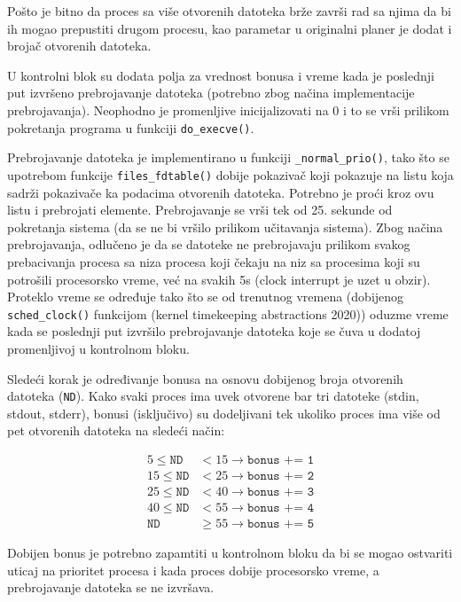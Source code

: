 Pošto je bitno da proces sa više otvorenih datoteka brže završi rad sa njima da bi ih mogao prepustiti drugom procesu, kao parametar u originalni planer je dodat i brojač otvorenih datoteka.

U kontrolni blok su dodata polja za vrednost bonusa i vreme kada je poslednji put izvršeno prebrojavanje datoteka (potrebno zbog načina implementacije prebrojavanja). Neophodno je promenljive inicijalizovati na 0 i to se vrši prilikom pokretanja programa u funkciji \verb|do_execve()|. 

Prebrojavanje datoteka je implementirano u funkciji \verb|_normal_prio()|, tako što se upotrebom funkcije \verb|files_fdtable()| dobije pokazivač koji pokazuje na listu koja sadrži pokazivače ka podacima otvorenih datoteka. Potrebno je proći kroz ovu listu i prebrojati elemente. Prebrojavanje se vrši tek od 25. sekunde od pokretanja sistema (da se ne bi vršilo prilikom učitavanja sistema). Zbog načina prebrojavanja, odlučeno je da se datoteke ne prebrojavaju prilikom svakog prebacivanja procesa sa niza procesa koji čekaju na niz sa procesima koji su potrošili procesorsko vreme, već na svakih 5s (clock interrupt je uzet u obzir). Proteklo vreme se određuje tako što se od trenutnog vremena (dobijenog \verb|sched_clock()| funkcijom (kernel timekeeping abstractions 2020)) oduzme vreme kada se poslednji put izvršilo prebrojavanje datoteka koje se čuva u dodatoj promenljivoj u kontrolnom bloku.

Sledeći korak je određivanje bonusa na osnovu dobijenog broja otvorenih datoteka (\texttt{ND}). Kako svaki proces ima uvek otvorene bar tri datoteke (stdin, stdout, stderr), bonusi (isključivo) su dodeljivani tek ukoliko proces ima više od pet otvorenih datoteka na sledeći način:

\begin{align*}
    5 \leq \texttt{ND} & < 15 \rightarrow \texttt{bonus += 1} \\
    15 \leq \texttt{ND} & < 25 \rightarrow \texttt{bonus += 2} \\
    25 \leq \texttt{ND} & < 40 \rightarrow \texttt{bonus += 3} \\
    40 \leq \texttt{ND} & < 55 \rightarrow \texttt{bonus += 4} \\ 
    \texttt{ND} & \geq 55 \rightarrow \texttt{bonus += 5}
\end{align*}

Dobijen bonus je potrebno zapamtiti u kontrolnom bloku da bi se mogao ostvariti uticaj na prioritet procesa i kada proces dobije procesorsko vreme, a prebrojavanje datoteka se ne izvršava.

